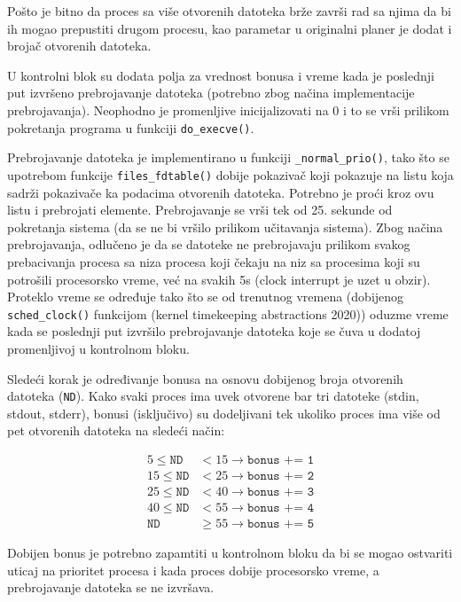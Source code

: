 Pošto je bitno da proces sa više otvorenih datoteka brže završi rad sa njima da bi ih mogao prepustiti drugom procesu, kao parametar u originalni planer je dodat i brojač otvorenih datoteka.

U kontrolni blok su dodata polja za vrednost bonusa i vreme kada je poslednji put izvršeno prebrojavanje datoteka (potrebno zbog načina implementacije prebrojavanja). Neophodno je promenljive inicijalizovati na 0 i to se vrši prilikom pokretanja programa u funkciji \verb|do_execve()|. 

Prebrojavanje datoteka je implementirano u funkciji \verb|_normal_prio()|, tako što se upotrebom funkcije \verb|files_fdtable()| dobije pokazivač koji pokazuje na listu koja sadrži pokazivače ka podacima otvorenih datoteka. Potrebno je proći kroz ovu listu i prebrojati elemente. Prebrojavanje se vrši tek od 25. sekunde od pokretanja sistema (da se ne bi vršilo prilikom učitavanja sistema). Zbog načina prebrojavanja, odlučeno je da se datoteke ne prebrojavaju prilikom svakog prebacivanja procesa sa niza procesa koji čekaju na niz sa procesima koji su potrošili procesorsko vreme, već na svakih 5s (clock interrupt je uzet u obzir). Proteklo vreme se određuje tako što se od trenutnog vremena (dobijenog \verb|sched_clock()| funkcijom (kernel timekeeping abstractions 2020)) oduzme vreme kada se poslednji put izvršilo prebrojavanje datoteka koje se čuva u dodatoj promenljivoj u kontrolnom bloku.

Sledeći korak je određivanje bonusa na osnovu dobijenog broja otvorenih datoteka (\texttt{ND}). Kako svaki proces ima uvek otvorene bar tri datoteke (stdin, stdout, stderr), bonusi (isključivo) su dodeljivani tek ukoliko proces ima više od pet otvorenih datoteka na sledeći način:

\begin{align*}
    5 \leq \texttt{ND} & < 15 \rightarrow \texttt{bonus += 1} \\
    15 \leq \texttt{ND} & < 25 \rightarrow \texttt{bonus += 2} \\
    25 \leq \texttt{ND} & < 40 \rightarrow \texttt{bonus += 3} \\
    40 \leq \texttt{ND} & < 55 \rightarrow \texttt{bonus += 4} \\ 
    \texttt{ND} & \geq 55 \rightarrow \texttt{bonus += 5}
\end{align*}

Dobijen bonus je potrebno zapamtiti u kontrolnom bloku da bi se mogao ostvariti uticaj na prioritet procesa i kada proces dobije procesorsko vreme, a prebrojavanje datoteka se ne izvršava.

